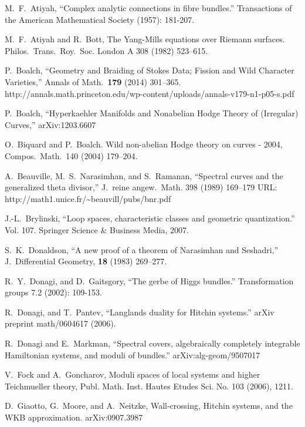 \documentclass[oneside,english]{amsbook}
\theoremstyle{definition}
\numberwithin{section}{chapter}
\numberwithin{equation}{section}
\numberwithin{figure}{section}
\theoremstyle{plain}
\theoremstyle{definition}
\theoremstyle{remark}
\theoremstyle{definition}
\theoremstyle{definition}
\theoremstyle{plain}
\theoremstyle{plain}
\begin{document}
\begin{thebibliography}{AB}
M.~F.~Atiyah, ``Complex analytic connections in fibre
bundles.'' Transactions of the American Mathematical Society (1957):
181-207.

M.~F.~Atiyah and R.~Bott, The Yang-Mills equations
over Riemann surfaces. Philos.~Trans.~Roy.~Soc. London A 308 (1982)
523--615.

P.~Boalch, ``Geometry and Braiding of Stokes Data;
Fission and Wild Character Varieties,'' Annals of Math.~\textbf{179}
(2014) 301--365. http://annals.math.princeton.edu/wp-content/uploads/annals-v179-n1-p05-s.pdf

P.~Boalch, ``Hyperkaehler Manifolds and Nonabelian
Hodge Theory of (Irregular) Curves,'' arXiv:1203.6607

O.~Biquard and P.~Boalch. Wild non-abelian Hodge
theory on curves - 2004, Compos.~Math.~140 (2004) 179--204.

A.~Beauville, M.~S.~Narasimhan, and S.~Ramanan,
``Spectral curves and the generalized theta divisor,'' J.~reine
angew.~Math. 398 (1989) 169--179 URL: http://math1.unice.fr/\textasciitilde{}beauvill/pubs/bnr.pdf

J.-L.~Brylinski, ``Loop spaces, characteristic classes
  and geometric quantization.'' Vol. 107. Springer Science \& Business Media, 2007.

S.~K.~Donaldson, ``A new proof of a theorem of Narasimhan
and Seshadri,'' J.~Differential Geometry, \textbf{18} (1983) 269--277.

R.~Y.~Donagi, and D.~Gaitsgory, ``The gerbe of Higgs
  bundles.'' Transformation groups 7.2 (2002): 109-153.

R.~Donagi, and T.~Pantev, ``Langlands duality for
  Hitchin systems.'' arXiv preprint math/0604617 (2006).

R.~Donagi and E.~Markman, ``Spectral covers, algebraically
completely integrable Hamiltonian systems, and moduli of bundles.''
arXiv:alg-geom/9507017

V.~Fock and A.~Goncharov, Moduli spaces of local
systems and higher Teichmueller theory, Publ. Math. Inst. Hautes Etudes
Sci. No. 103 (2006), 1\textendash{}211.

 D.~Giaotto, G.~Moore, and A.~Neitzke, Wall-crossing,
Hitchin systems, and the WKB approximation. arXiv:0907.3987


\end{thebibliography}
\end{document}
